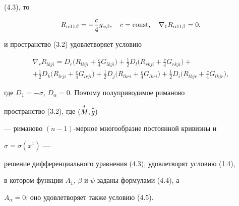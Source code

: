 \begin{notes}
(4.3), то 


$$ 


R_{\alpha 11\beta}=-\frac{c}{4}g_{\alpha\beta},\quad 


c=\const,\quad \nabla_1 R_{\alpha 11\beta}=0, 


$$ 


и пространство (3.2) удовлетворяет условию 


\begin{multline} 


\nabla_r R_{lkji}=D_r\bigg(R_{lkji}+\frac{c}{4}G_{lkji}\bigg)+ 


\frac{1}{2}D_l\biggl(R_{rkji}+\frac{c}{4}G_{rkji} \biggr)+ \\ 


+\frac{1}{2}D_k\biggl(R_{lrji}+\frac{c}{4}G_{lrji} \biggr)+ 


\frac{1}{2}D_j\biggl(R_{lkri}+\frac{c}{4}G_{lkri} \biggr)+ 


\frac{1}{2}D_i\biggl(R_{lkjr}+\frac{c}{4}G_{lkjr} \biggr), 


\end{multline} 


где $D_1=-\sigma$, $D_\alpha=0$. Поэтому полуприводимое риманово 


пространство (3.2), где $(\overset{*}{M}{},\overset{*}{g}{})$ 


--- риманово $(n-1)$-мерное многообразие постоянной кривизны и 


$\sigma=\sigma(x^1)$ --- 


решение дифференциального уравнения (4.3), удовлетворят условию (1.4), 


в котором функции $A_1$, $\beta$ и $\psi$ заданы формулами (4.4), а 


$A_\alpha=0$; оно удовлетворяет также условию (4.5). 


\end{notes} 


 


 


